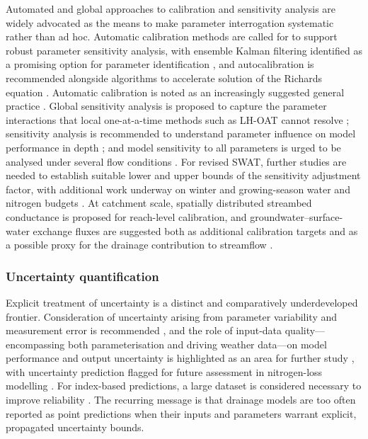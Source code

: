 Automated and global approaches to calibration and sensitivity analysis are widely advocated as the means to make parameter interrogation systematic rather than ad hoc. Automatic calibration methods are called for to support robust parameter sensitivity analysis, with ensemble Kalman filtering identified as a promising option for parameter identification \parencite{Warsta2014}, and autocalibration is recommended alongside algorithms to accelerate solution of the Richards equation \parencite{Sadhukhan2019b}. Automatic calibration is noted as an increasingly suggested general practice \parencite{Singh2019b}. Global sensitivity analysis is proposed to capture the parameter interactions that local one-at-a-time methods such as LH-OAT cannot resolve \parencite{Timalsina2023}; sensitivity analysis is recommended to understand parameter influence on model performance in depth \parencite{Chelil2022}; and model sensitivity to all parameters is urged to be analysed under several flow conditions \parencite{Kacimov2000}. For revised SWAT, further studies are needed to establish suitable lower and upper bounds of the sensitivity adjustment factor, with additional work underway on winter and growing-season water and nitrogen budgets \parencite{Moriasi2013b}. At catchment scale, spatially distributed streambed conductance is proposed for reach-level calibration, and groundwater--surface-water exchange fluxes are suggested both as additional calibration targets and as a possible proxy for the drainage contribution to streamflow \parencite{Karan2021}.

\subsubsection{Uncertainty quantification}

Explicit treatment of uncertainty is a distinct and comparatively underdeveloped frontier. Consideration of uncertainty arising from parameter variability and measurement error is recommended \parencite{Alzraiee2013b}, and the role of input-data quality---encompassing both parameterisation and driving weather data---on model performance and output uncertainty is highlighted as an area for further study \parencite{Upadhyay2019}, with uncertainty prediction flagged for future assessment in nitrogen-loss modelling \parencite{Tao2021}. For index-based predictions, a large dataset is considered necessary to improve reliability \parencite{Beauchemin2003}. The recurring message is that drainage models are too often reported as point predictions when their inputs and parameters warrant explicit, propagated uncertainty bounds.

